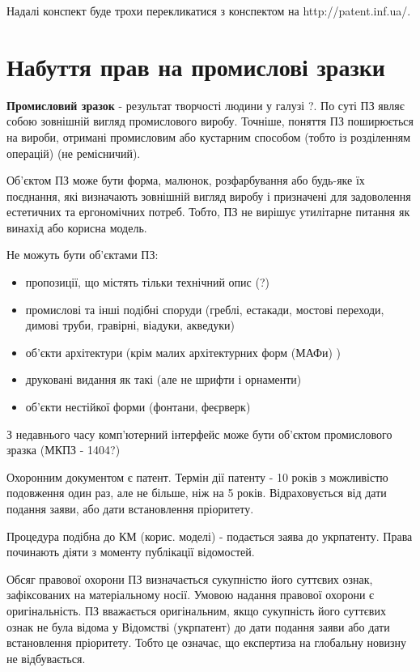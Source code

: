 Надалі конспект буде трохи перекликатися з конспектом на http://patent.inf.ua/.

\section{Набуття прав на промислові зразки}

\textbf{Промисловий зразок} - результат творчості людини у галузі ?. По суті ПЗ являє собою зовнішній вигляд промислового виробу. Точніше, поняття ПЗ поширюється на вироби, отримані промисловим або кустарним способом (тобто із розділенням операцій) (не ремісничий). 

Об’єктом ПЗ може бути форма, малюнок, розфарбування або будь-яке їх поєднання, які визначають зовнішній вигляд виробу і призначені для задоволення естетичних та ергономічних потреб. Тобто, ПЗ не вирішує утилітарне питання як винахід або корисна модель.

Не можуть бути об’єктами ПЗ:
\begin{itemize}
	\item пропозиції, що містять тільки технічний опис (?)
	\item промислові та інші подібні споруди (греблі, естакади, мостові переходи, димові труби, гравірні, віадуки, акведуки)
	\item об’єкти архітектури (крім малих архітектурних форм (МАФи) )
	\item друковані видання як такі (але не шрифти і орнаменти)
	\item об’єкти нестійкої форми (фонтани, феєрверк)
\end{itemize}

З недавнього часу комп’ютерний інтерфейс може бути об’єктом промислового зразка (МКПЗ - 1404?)

Охоронним документом є патент. Термін дії патенту - 10 років з можливістю подовження один раз, але не більше, ніж на 5 років. Відраховується від дати подання заяви, або дати встановлення пріоритету. 

Процедура подібна до КМ (корис. моделі) - подається заява до укрпатенту. Права починають діяти з моменту публікації відомостей. 

Обсяг правової охорони ПЗ  визначається сукупністю його суттєвих ознак, зафіксованих на матеріальному носії. Умовою надання правової охорони є оригінальність. ПЗ вважається оригінальним, якщо сукупність його суттєвих ознак не була відома у Відомстві (укрпатент) до дати подання заяви або дати встановлення пріоритету. Тобто це означає, що експертиза на глобальну новизну не відбувається.


